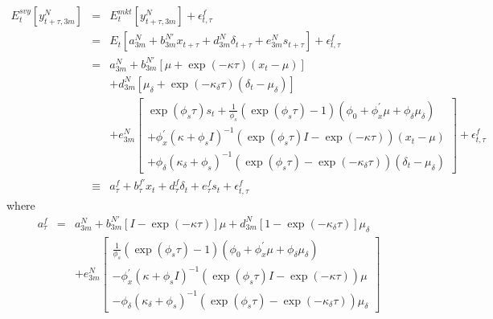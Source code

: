 \documentclass{article}
\begin{document}
\begin{eqnarray*}
E_{t}^{svy}\left[ y_{t+\tau ,3m}^{N}\right] &=&E_{t}^{mkt}\left[ y_{t+\tau
,3m}^{N}\right] +\epsilon _{t,\tau }^{f} \\
&=&E_{t}\left[ a_{3m}^{N}+b_{3m}^{N\prime }x_{t+\tau }+d_{3m}^{N}\delta
_{t+\tau }+e_{3m}^{N}s_{t+\tau }\right] +\epsilon _{t,\tau }^{f} \\
&=&a_{3m}^{N}+b_{3m}^{N\prime }\left[ \mu +\exp \left( -\kappa \tau \right)
\left( x_{t}-\mu \right) \right] \\
&&+d_{3m}^{N}\left[ \mu _{\delta }+\exp \left( -\kappa _{\delta }\tau
\right) \left( \delta _{t}-\mu _{\delta }\right) \right] \\
&&+e_{3m}^{N}\left[ 
\begin{array}{c}
\exp \left( \phi _{s}\tau \right) s_{t}+\frac{1}{\phi _{s}}\left( \exp
\left( \phi _{s}\tau \right) -1\right) \left( \phi _{0}+\phi _{x}^{\prime
}\mu +\phi _{\delta }\mu _{\delta }\right) \\ 
+\phi _{x}^{\prime }\left( \kappa +\phi _{s}I\right) ^{-1}\left( \exp \left(
\phi _{s}\tau \right) I-\exp \left( -\kappa \tau \right) \right) \left(
x_{t}-\mu \right) \\ 
+\phi _{\delta }\left( \kappa _{\delta }+\phi _{s}\right) ^{-1}\left( \exp
\left( \phi _{s}\tau \right) -\exp \left( -\kappa _{\delta }\tau \right)
\right) \left( \delta _{t}-\mu _{\delta }\right)%
\end{array}%
\right] +\epsilon _{t,\tau }^{f} \\
&\equiv &a_{\tau }^{f}+b_{\tau }^{f\prime }x_{t}+d_{\tau }^{f}\delta
_{t}+e_{\tau }^{f}s_{t}+\epsilon _{t,\tau }^{f}
\end{eqnarray*}%
where%
\begin{eqnarray*}
a_{\tau }^{f} &=&a_{3m}^{N}+b_{3m}^{N\prime }\left[ I-\exp \left( -\kappa
\tau \right) \right] \mu +d_{3m}^{N}\left[ 1-\exp \left( -\kappa _{\delta
}\tau \right) \right] \mu _{\delta } \\
&&+e_{3m}^{N}\left[ 
\begin{array}{c}
\frac{1}{\phi _{s}}\left( \exp \left( \phi _{s}\tau \right) -1\right) \left(
\phi _{0}+\phi _{x}^{\prime }\mu +\phi _{\delta }\mu _{\delta }\right) \\ 
-\phi _{x}^{\prime }\left( \kappa +\phi _{s}I\right) ^{-1}\left( \exp \left(
\phi _{s}\tau \right) I-\exp \left( -\kappa \tau \right) \right) \mu \\ 
-\phi _{\delta }\left( \kappa _{\delta }+\phi _{s}\right) ^{-1}\left( \exp
\left( \phi _{s}\tau \right) -\exp \left( -\kappa _{\delta }\tau \right)
\right) \mu _{\delta }%
\end{array}%
\right]
\end{eqnarray*}%
\end{document}
